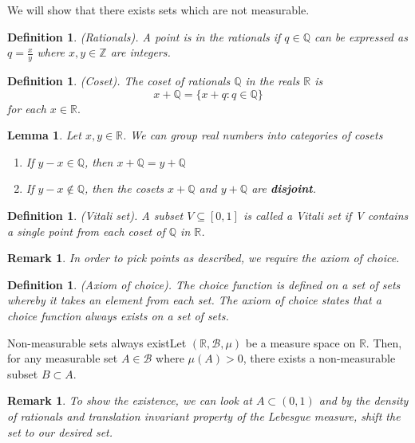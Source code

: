 \documentclass[twoside]{article}
\newtheorem{lemma}[theorem]{Lemma}
\newtheorem{definition}[theorem]{Definition}
\newtheorem{remark}[theorem]{Remark}
\newcommand{\borelsigmaalgebra}{\mathcal{B}}
\begin{document}
We will show that there exists sets which are not measurable.

\begin{definition}(Rationals). A point is in the rationals if $q \in \mathbb{Q}$ can be expressed as $q = \frac{x}{y}$ where $x,y \in \mathbb{Z}$ are integers.
\end{definition}

\begin{definition}(Coset). The coset of rationals $\mathbb{Q}$ in the reals $\mathbb{R}$ is 
$$
x + \mathbb{Q} = \{x + q: q \in \mathbb{Q}\}
$$
for each $x \in \mathbb{R}.$
\end{definition}

\begin{lemma}Let $x, y \in \mathbb{R}$. We can group real numbers into categories of cosets
\begin{enumerate}
\item If $y - x \in \mathbb{Q}$, then $x + \mathbb{Q} = y + \mathbb{Q}$
\item If $y - x \not \in \mathbb{Q}$, then the cosets $x + \mathbb{Q}$ and $ y + \mathbb{Q}$ are \textbf{disjoint}.
\end{enumerate}
\end{lemma}

\begin{definition}(Vitali set). A subset $V \subseteq [0,1]$ is called a Vitali set if V contains a single point from each coset of $\mathbb{Q}$ in $\mathbb{R}$.
\end{definition}

\begin{remark}In order to pick points as described, we require the axiom of choice.
\end{remark}

\begin{definition}(Axiom of choice). The choice function is defined on a set of sets whereby it takes an element from each set. The axiom of choice states that a choice function always exists on a set of sets.
\end{definition}


\begin{theorem_exam}{Non-measurable sets always exist}{}Let $(\mathbb{R}, \borelsigmaalgebra, \mu)$ be a measure space on $\mathbb{R}$. Then, for any measurable set $A \in \borelsigmaalgebra$ where $\mu(A) > 0$, there exists a non-measurable subset $B \subset A$.
\end{theorem_exam}

\begin{remark}To show the existence, we can look at $A \subset (0,1)$ and by the density of rationals and translation invariant property of the Lebesgue measure, shift the set to our desired set.
\end{remark}
\end{document}
